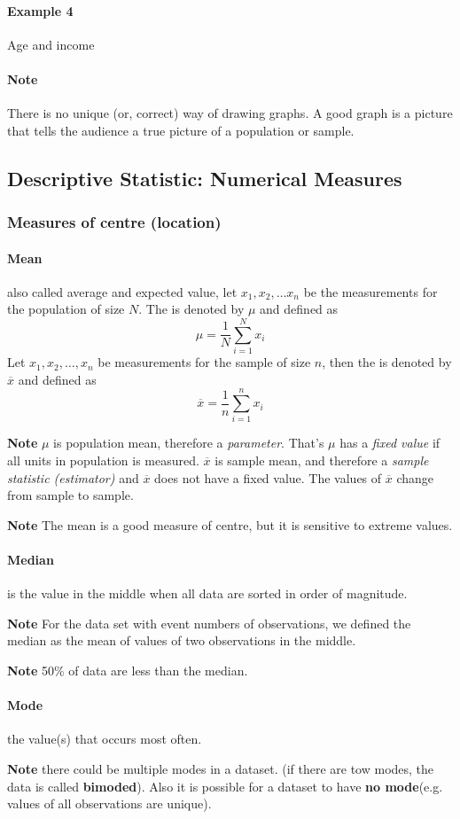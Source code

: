 \documentclass[11pt]{article}
\begin{document}
	\paragraph{Example 4} Age and income
	
	\paragraph{Note} There is no unique (or, correct) way of drawing graphs. A good graph is a picture that tells the audience a true picture of a population or sample.
	
	\subsection{Descriptive Statistic: Numerical Measures}
	\subsubsection{Measures of centre (location)}
	\paragraph{Mean} also called average and expected value, let $x_1, x_2, \dots x_n$ be the measurements for the population of size $N$. The  is denoted by $\mu$ and defined as 
	\[
		\mu = \frac{1}{N} \sum_{i=1}^N x_i
	\] Let $x_1, x_2, \dots, x_n$ be measurements for the sample of size $n$, then the  is denoted by $\overline{x}$ and defined as
	\[
		\overline{x} = \frac{1}{n} \sum_{i=1}^n x_i
	\]
	
	\textbf{Note} $\mu$ is population mean, therefore a \emph{parameter}. That's $\mu$ has a \emph{fixed value} if all units in population is measured. $\overline{x}$ is sample mean, and therefore a \emph{sample statistic (estimator)} and $\overline{x}$ does not have a fixed value. The values of $\overline{x}$ change from sample to sample.
	
	\textbf{Note} The mean is a good measure of centre, but it is sensitive to extreme values.
	
	\paragraph{Median} is the value in the middle when all data are sorted in order of magnitude.
	
	\textbf{Note} For the data set with event numbers of observations, we defined the median as the mean of values of two observations in the middle.
	
	\textbf{Note} 50\% of data are less than the median.
	
	\paragraph{Mode} the value(s) that occurs most often.
	
	\textbf{Note} there could be multiple modes in a dataset. (if there are tow modes, the data is called \textbf{bimoded}). Also it is possible for a dataset to have \textbf{no mode}(e.g. values of all observations are unique).
\end{document}
